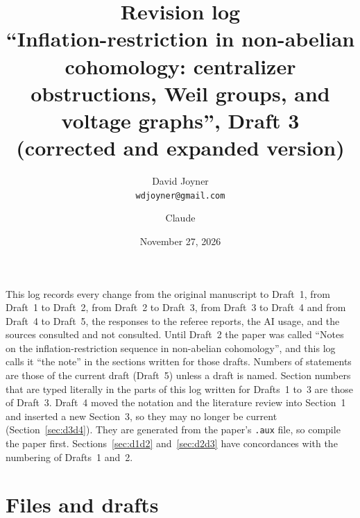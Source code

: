 \documentclass[12pt,letterpaper]{article}
\title{Revision log\\[4pt]\large ``Inflation-restriction in non-abelian
cohomology: centralizer obstructions, Weil groups, and voltage graphs'',
Draft 3\\(corrected and expanded
version)}
\author{David Joyner\\\texttt{wdjoyner@gmail.com} \and Claude}
\date{November 27, 2026}
\begin{document}
\maketitle

\noindent This log records every change from the original manuscript to
Draft~1, from Draft~1 to Draft~2, from Draft~2 to Draft~3, from Draft~3
to Draft~4 and from Draft~4 to Draft~5, the
responses to the referee reports, the AI usage, and the sources
consulted and not consulted. Until Draft~2 the paper was called ``Notes
on the inflation-restriction sequence in non-abelian cohomology'', and
this log calls it ``the note'' in the sections written for those drafts.
Numbers of statements are those of the current draft (Draft~5) unless a
draft is named. Section numbers that are typed literally in the parts of
this log written for Drafts~1 to~3 are those of Draft~3. Draft~4 moved
the notation and the literature review into Section~1 and inserted a new
Section~3, so they may no longer be current
(Section~\ref{sec:d3d4}). They are generated from the paper's \texttt{.aux} file,
so compile the paper first. Sections~\ref{sec:d1d2} and~\ref{sec:d2d3}
have concordances with the numbering of Drafts~1 and~2.

\section{Files and drafts}\label{sec:files}
\end{document}
